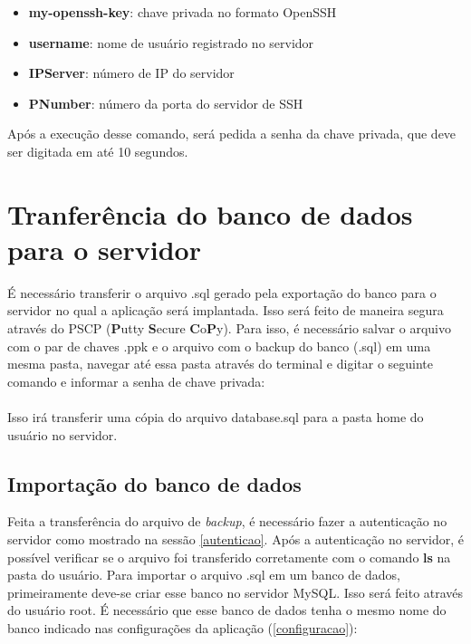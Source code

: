 \documentclass[11pt,a4paper]{report}
\begin{document}

\begin{itemize}
\item \textbf{my-openssh-key}: chave privada no formato OpenSSH
\item \textbf{username}: nome de usuário registrado no servidor
\item \textbf{IPServer}: número de IP do servidor
\item \textbf{PNumber}: número da porta do servidor de SSH
\end{itemize}

Após a execução desse comando, será pedida a senha da chave privada, que deve ser digitada em até 10 segundos. 

\section{Tranferência do banco de dados para o servidor}

É necessário transferir o arquivo .sql gerado pela exportação do banco para o servidor no qual a aplicação será implantada. Isso será feito de maneira segura através do PSCP (\textbf{P}utty \textbf{S}ecure \textbf{C}o\textbf{P}y). Para isso, é necessário salvar o arquivo com o par de chaves .ppk e o arquivo com o backup do banco (.sql) em uma mesma pasta, navegar até essa pasta através do terminal e digitar o seguinte comando e informar a senha de chave privada: \\

 \\

Isso irá transferir uma cópia do arquivo database.sql para a pasta home do usuário no servidor.

\subsection{Importação do banco de dados}

Feita a transferência do arquivo de \textit{backup}, é necessário fazer a autenticação no servidor como mostrado na sessão \ref{autenticao}. Após a autenticação no servidor, é possível verificar se o arquivo foi transferido corretamente com o comando \textbf{ls} na pasta do usuário. Para importar o arquivo .sql em um banco de dados, primeiramente deve-se criar esse banco no servidor MySQL. Isso será feito através do usuário root. É necessário que esse banco de dados tenha o mesmo nome do banco indicado nas configurações da aplicação (\ref{configuracao}): \\
\end{document}
